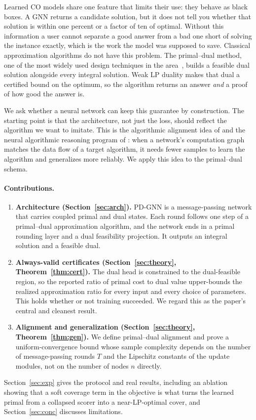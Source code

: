 \documentclass[11pt]{article}
\theoremstyle{plain}
\theoremstyle{definition}
\theoremstyle{remark}
\newcommand{\PDGNN}{\textsc{PD-GNN}}
\begin{document}
Learned CO models share one feature that limits their use: they behave as black
boxes. A GNN returns a candidate solution, but it does not tell you whether that
solution is within one percent or a factor of ten of optimal. Without this
information a user cannot separate a good answer from a bad one short of solving
the instance exactly, which is the work the model was supposed to save.
Classical approximation algorithms do not have this problem. The primal--dual
method, one of the most widely used design techniques in the
area~\citep{williamson2011design}, builds a feasible dual solution alongside
every integral solution. Weak LP duality makes that dual a certified bound on
the optimum, so the algorithm returns an answer \emph{and} a proof of how good
the answer is.

We ask whether a neural network can keep this guarantee by construction. The
starting point is that the architecture, not just the loss, should reflect the
algorithm we want to imitate. This is the algorithmic alignment idea of
\citet{xu2020what} and the neural algorithmic reasoning program of
\citet{velivckovic2021neural}: when a network's computation graph matches the
data flow of a target algorithm, it needs fewer samples to learn the algorithm
and generalizes more reliably. We apply this idea to the primal--dual schema.

\paragraph{Contributions.}
\begin{enumerate}
\item \textbf{Architecture (Section~\ref{sec:arch}).} \PDGNN{} is a
message-passing network that carries coupled primal and dual states. Each round
follows one step of a primal--dual approximation algorithm, and the network ends
in a primal rounding layer and a dual feasibility projection. It outputs an
integral solution and a feasible dual.
\item \textbf{Always-valid certificates (Section~\ref{sec:theory},
Theorem~\ref{thm:cert}).} The dual head is constrained to the dual-feasible
region, so the reported ratio of primal cost to dual value upper-bounds the
realized approximation ratio for every input and every choice of parameters.
This holds whether or not training succeeded. We regard this as the paper's
central and cleanest result.
\item \textbf{Alignment and generalization (Section~\ref{sec:theory},
Theorem~\ref{thm:gen}).} We define primal--dual alignment and prove a
uniform-convergence bound whose sample complexity depends on the number of
message-passing rounds $T$ and the Lipschitz constants of the update modules,
not on the number of nodes $n$ directly.
\end{enumerate}
Section~\ref{sec:exp} gives the protocol and real results, including an ablation
showing that a soft coverage term in the objective is what turns the learned
primal from a collapsed scorer into a near-LP-optimal cover, and
Section~\ref{sec:conc} discusses limitations.
\end{document}
